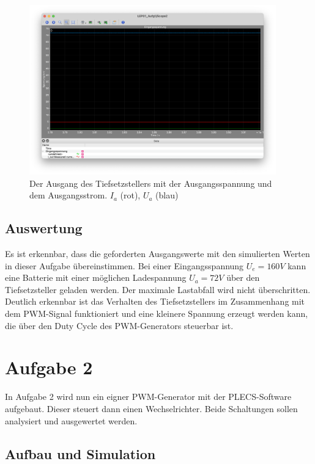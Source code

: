 \documentclass{report}
\begin{document}
\begin{figure}
  \begin{center}
    \includegraphics[width=0.95\textwidth]{assets/img/aufg1_ausgang.png}
  \end{center}
  \caption{Der Ausgang des Tiefsetzstellers mit der Ausgangsspannung und dem Ausgangsstrom. $I_a$ (rot), $U_a$ (blau)}
  \label{fig:aufg1_ausgang}
\end{figure}

\subsection{Auswertung}

Es ist erkennbar, dass die geforderten Ausgangswerte mit den simulierten Werten in dieser Aufgabe übereinstimmen. Bei einer Eingangsspannung $U_e = 160V$ kann eine Batterie mit einer möglichen Ladespannung $U_a = 72V$ über den Tiefsetzsteller geladen werden. Der maximale Lastabfall wird nicht überschritten. Deutlich erkennbar ist das Verhalten des Tiefsetzstellers im Zusammenhang mit dem PWM-Signal funktioniert und eine kleinere Spannung erzeugt werden kann, die über den Duty Cycle des PWM-Generators steuerbar ist. 

\section{Aufgabe 2}

In Aufgabe 2 wird nun ein eigner PWM-Generator mit der PLECS-Software aufgebaut. Dieser steuert dann einen Wechselrichter. Beide Schaltungen sollen analysiert und ausgewertet werden.

\subsection{Aufbau und Simulation}
\end{document}
